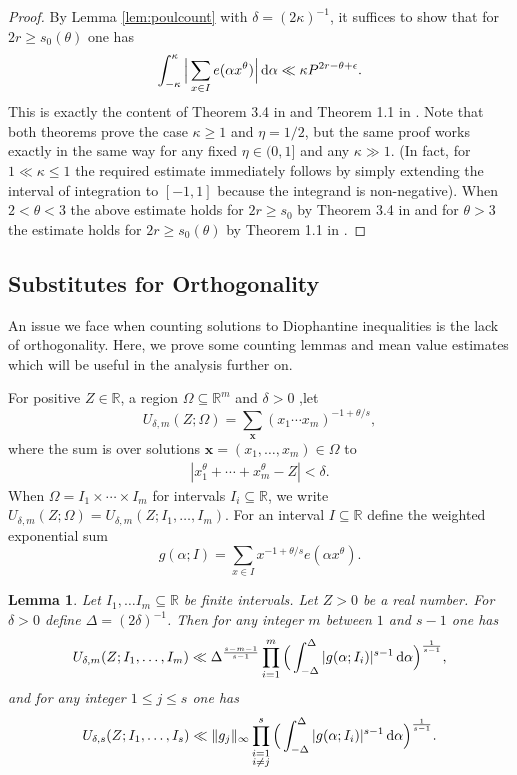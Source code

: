 \documentclass[11pt,reqno]{amsart}
\numberwithin{equation}{section}
\newtheorem{lemma}{Lemma}[section]
\renewcommand{\d}{\,{\rm d}}
\begin{document}
\begin{proof} By Lemma \ref{lem:poulcount} with $\delta = (2\kappa)^{-1}$, it suffices to show that for $2r \geq s_0(\theta)$ one has 
\[ \int_{-\kappa}^{\kappa} \Big| \sum_{x \in I} e(\alpha x^{\theta}) \Big| \d\alpha \ll \kappa P^{2r-\theta+\epsilon}. \]
This is exactly the content of Theorem 3.4 in \cite{Poulias1} and Theorem 1.1 in \cite{BharMVE}. Note that both theorems prove the case $\kappa \geq 1$ and $\eta = 1/2$, but the same proof works exactly in the same way for any fixed $\eta \in (0,1]$ and any $\kappa \gg 1$. (In fact, for $1 \ll \kappa \leq 1$ the required estimate immediately follows by simply extending the interval of integration to $[-1,1]$ because the integrand is non-negative). When $2 < \theta < 3$ the above estimate holds for $2r \geq s_0$ by Theorem 3.4 in \cite{Poulias1} and for $\theta > 3$ the estimate holds for $2r \geq s_0(\theta)$ by Theorem 1.1 in \cite{BharMVE}. 
\end{proof}




\subsection{Substitutes for Orthogonality} An issue we face when counting solutions to Diophantine inequalities is the lack of orthogonality. Here, we prove some counting lemmas and mean value estimates which will be useful in the analysis further on. 

For positive $Z \in \mathbb{R}$, a region $\Omega \subseteq \mathbb{R}^m$ and $\delta > 0$ ,let 
\[ U_{\delta,m}(Z;\Omega) = \sum_{\mathbf{x}}  (x_1\cdots x_m)^{-1+\theta/s}, \]
where the sum is over solutions $\mathbf{x} = (x_1,\ldots,x_m) \in \Omega$ to 
\begin{align} \label{eq:approxdioph}
|x_1^{\theta}+\cdots+x_m^{\theta}-Z| < \delta.
\end{align}
When $\Omega = I_1\times \cdots \times I_m$ for intervals $I_i \subseteq \mathbb{R}$, we write $U_{\delta,m}(Z;\Omega) = U_{\delta,m}(Z;I_1,\ldots,I_m)$. 
For an interval $I \subseteq \mathbb{R}$ define the weighted exponential sum 
\[ g(\alpha; I) = \sum_{x \in I} x^{-1+\theta/s}e(\alpha x^{\theta}). \]


\begin{lemma} \label{lem:count} 
Let $I_1,\ldots I_m \subseteq \mathbb{R}$ be finite intervals. Let $Z > 0$ be a real number. For $\delta > 0$ define $\Delta = (2\delta)^{-1}$. Then for any integer $m$ between $1$ and $s-1$ one has 
\[ U_{\delta,m}(Z; I_1,\ldots, I_m) \ll \Delta^{\frac{s-m-1}{s-1}} \prod_{i=1}^m \Big(\int_{-\Delta}^{\Delta} |g(\alpha; I_i)|^{s-1}\d\alpha\Big)^{\frac{1}{s-1}}, \]
and for any integer $1 \leq j \leq s$ one has 
\[ U_{\delta,s}(Z; I_1,\ldots, I_s) \ll \|g_j\|_{\infty}\prod_{\substack{i=1 \\ i \neq j}}^s \Big(\int_{-\Delta}^{\Delta} |g(\alpha;I_i)|^{s-1}\d\alpha \Big)^{\frac{1}{s-1}}. \]
\end{lemma}
\end{document}
